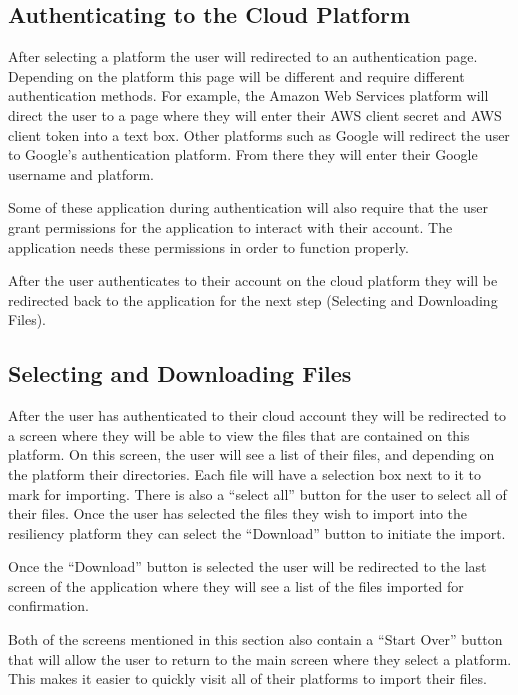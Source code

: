 \documentclass{article}
\begin{document}
      \subsection{Authenticating to the Cloud Platform}
      After selecting a platform the user will redirected to an authentication page. Depending on the platform this page will be different and require different authentication methods.
      For example, the Amazon Web Services platform will direct the user to a page where they will enter their AWS client secret and AWS client token into a text box. Other platforms such as Google
      will redirect the user to Google's authentication platform. From there they will enter their Google username and platform.

      Some of these application during authentication will also require that the user grant permissions for the application to interact with their account. The application needs these permissions in order
      to function properly.

      After the user authenticates to their account on the cloud platform they will be redirected back to the application for the next step (Selecting and Downloading Files).

      \subsection{Selecting and Downloading Files}
      After the user has authenticated to their cloud account they will be redirected to a screen where they will be able to view the files that are contained on this platform. On this screen, the user will
      see a list of their files, and depending on the platform their directories. Each file will have a selection box next to it to mark for importing. There is also a ``select all'' button for the user to select
      all of their files. Once the user has selected the files they wish to import into the resiliency platform they can select the ``Download'' button to initiate the import.

      Once the ``Download'' button is selected the user will be redirected to the last screen of the application where they will see a list of the files imported for confirmation.

      Both of the screens mentioned in this section also contain a ``Start Over'' button that will allow the user to return to the main screen where they select a platform. This makes it easier to quickly visit all of
      their platforms to import their files.
\end{document}
